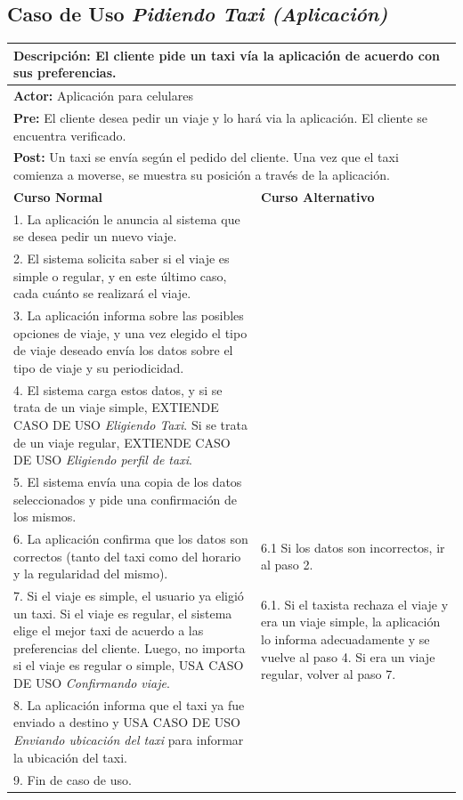 \documentclass[a4paper]{article}
\begin{document}
\subsection{Caso de Uso \textit{Pidiendo Taxi (Aplicaci\'on)}}
\begin{center}
\begin{tabular}{|p{10cm} | p{6cm}|}
\hline
\multicolumn{2}{|p{15cm}|}{\textbf{Descripci\'on:} El cliente pide un taxi v\'ia la aplicaci\'on de acuerdo con sus preferencias. } \\
\hline
\multicolumn{2}{|p{15cm}|}{\textbf{Actor:} Aplicaci\'on para celulares } \\
\hline
\multicolumn{2}{|p{15cm}|}{\textbf{Pre:} El cliente desea pedir un viaje y lo har\'a via la aplicaci\'on. El cliente se encuentra verificado. } \\
\hline
\multicolumn{2}{|p{15cm}|}{\textbf{Post:} Un taxi se env\'ia seg\'un el pedido del cliente. Una vez que el taxi comienza a moverse, se muestra su posici\'on a trav\'es de la aplicaci\'on. }\\
\hline
\textbf{Curso Normal}  & \textbf{Curso Alternativo} \\ \hline
1. La aplicaci\'on le anuncia al sistema que se desea pedir un nuevo viaje. & \\ \hline
2. El sistema solicita saber si el viaje es simple o regular, y en este \'ultimo caso, cada cu\'anto se realizar\'a el viaje. & \\ \hline
3. La aplicaci\'on informa sobre las posibles opciones de viaje, y una vez elegido el tipo de viaje deseado env\'ia los datos sobre el tipo de viaje y su periodicidad. & \\ \hline
4. El sistema carga estos datos, y si se trata de un viaje simple, EXTIENDE CASO DE USO \textit{Eligiendo Taxi}. Si se trata de un viaje regular, EXTIENDE CASO DE USO \textit{Eligiendo perfil de taxi}. & \\ \hline
5. El sistema env\'ia una copia de los datos seleccionados y pide una confirmaci\'on de los mismos. & \\ \hline
6. La aplicaci\'on confirma que los datos son correctos (tanto del taxi como del horario y la regularidad del mismo). & 6.1 Si los datos son incorrectos, ir al paso 2. \\ \hline
7. Si el viaje es simple, el usuario ya eligi\'o un taxi. Si el viaje es regular, el sistema elige el mejor taxi de acuerdo a las preferencias del cliente. Luego, no importa si el viaje es regular o simple, USA CASO DE USO \textit{Confirmando viaje}. & 6.1. Si el taxista rechaza el viaje y era un viaje simple, la aplicaci\'on lo informa adecuadamente y se vuelve al paso 4. Si era un viaje regular, volver al paso 7. \\ \hline
8. La aplicaci\'on informa que el taxi ya fue enviado a destino y USA CASO DE USO \textit{Enviando ubicaci\'on del taxi} para informar la ubicaci\'on del taxi. & \\ \hline
9. Fin de caso de uso. & \\ \hline
\end{tabular}
\end{center}
\end{document}
